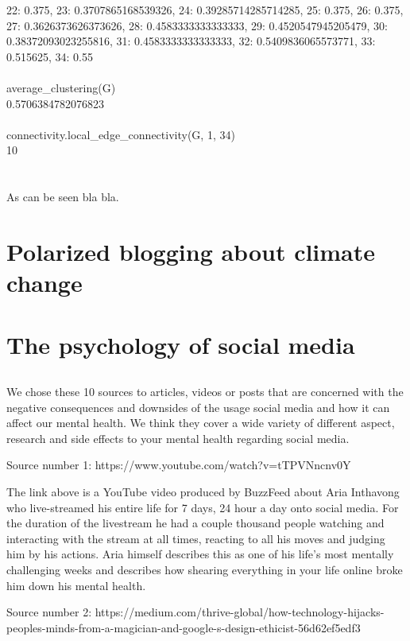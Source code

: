 \documentclass[11pt]{article}
\begin{document}
22: 0.375, 23: 0.3707865168539326, 24: 0.39285714285714285, 25: 0.375,
26: 0.375, 27: 0.3626373626373626, 28: 0.4583333333333333, 29: 0.4520547945205479,
30: 0.38372093023255816, 31: 0.4583333333333333, 32: 0.5409836065573771, 33: 0.515625, 34: 0.55
\\\\
average\_clustering(G)\\
0.5706384782076823
\\\\
connectivity.local\_edge\_connectivity(G, 1, 34)\\
10\\
\\\\
As can be seen bla bla.

\section{Polarized blogging about climate change}


\section{The psychology of social media}

\subsection{}

We chose these 10 sources to articles, videos or posts that are concerned with the negative consequences and downsides of the usage social media and how it can affect our mental health. We think they cover a wide variety of different aspect, research and side effects to your mental health regarding social media. 
	
Source number 1: 
https://www.youtube.com/watch?v=tTPVNncnv0Y

The link above is a YouTube video produced by BuzzFeed about Aria Inthavong who live-streamed his entire life for 7 days, 24 hour a day onto social media. For the duration of the livestream he had a couple thousand people watching and interacting with the stream at all times, reacting to all his moves and judging him by his actions. Aria himself describes this as one of his life's most mentally challenging weeks and describes how shearing everything in your life online broke him down his mental health.

Source number 2: https://medium.com/thrive-global/how-technology-hijacks-peoples-minds-from-a-magician-and-google-s-design-ethicist-56d62ef5edf3
\end{document}
